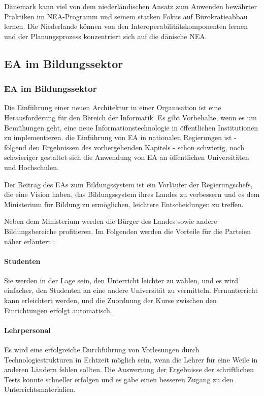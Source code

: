 \documentclass[
	doc,
	a4paper,
	helv
	]{apa6}
\begin{document}
Dänemark kann viel von dem niederländischen Ansatz zum Anwenden bewährter Praktiken im NEA-Programm und seinem starken Fokus auf Bürokratieabbau lernen. Die Niederlande können von den Interoperabilitätskomponenten lernen und der Planungsprozess konzentriert sich auf die dänische NEA.
	
\subsection{EA im Bildungssektor}
\subsubsection{EA im Bildungssektor}
Die Einführung einer neuen Architektur in einer Organisation ist eine Herausforderung für den Bereich der Informatik. Es gibt Vorbehalte, wenn es um Bemühungen geht, eine neue Informationstechnologie in öffentlichen Institutionen zu implementieren.  die Einführung  von EA in nationalen Regierungen ist -  folgend den Ergebnissen des vorhergehenden Kapitels - schon schwierig, noch schwieriger gestaltet sich die Anwendung von EA an öffentlichen Universitäten und Hochschulen.	

Der Beitrag des EAs zum Bildungssystem ist ein Vorläufer der Regierungschefs, die eine Vision haben, das Bildungssystem ihres Landes zu verbessern und es dem Ministerium für Bildung zu ermöglichen, leichtere Entscheidungen zu treffen. \autocite{RSN2014}

Neben dem Ministerium werden die Bürger des Landes sowie andere Bildungsbereiche profitieren.
Im Folgenden werden die Vorteile für die Parteien näher erläutert \autocite{ICT2015}:
\paragraph{Studenten}
Sie werden in der Lage sein, den Unterricht leichter zu wählen, und es wird einfacher, den Studenten an eine andere Universität zu vermitteln. Fernunterricht kann erleichtert werden, und die Zuordnung der Kurse zwischen den Einrichtungen erfolgt automatisch.
\paragraph{Lehrpersonal}
Es wird eine erfolgreiche Durchführung von Vorlesungen durch Technologiestrukturen in Echtzeit möglich sein, wenn die Lehrer für eine Weile in anderen Ländern fehlen sollten. Die Auswertung der Ergebnisse der schriftlichen Tests könnte schneller erfolgen und es gäbe einen besseren Zugang zu den Unterrichtsmaterialien.
\end{document}
